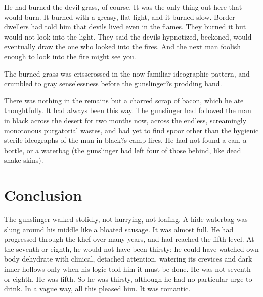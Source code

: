 \documentclass[
11pt,%
tightenlines,%
twoside,%
onecolumn,%
nofloats,%
nobibnotes,%
nofootinbib,%
superscriptaddress,%
noshowpacs,%
centertags]%
{revtex4}
\begin{document}
He had burned the devil-grass, of course. It was the only thing out here that would burn. It burned with a greasy, flat light, and it burned slow. Border dwellers had told him that devils lived even in the flames. They burned it but would not look into the light. They said the devils hypnotized, beckoned, would eventually draw the one who looked into the fires. And the next man foolish enough to look into the fire might see you.

The burned grass was crisscrossed in the now-familiar ideographic pattern, and crumbled to gray senselessness before the gunslinger?s prodding hand. 

There was nothing in the remains but a charred scrap of bacon, which he ate thoughtfully. It had always been this way. The gunslinger had followed the man in black across the desert for two months now, across the endless, screamingly monotonous purgatorial wastes, and had yet to find spoor other than the hygienic sterile ideographs of the man in black?s camp fires. He had not found a can, a bottle, or a waterbag (the gunslinger had left four of those behind, like dead snake-skins).

\section{Conclusion}

The gunslinger walked stolidly, not hurrying, not loafing. A hide waterbag was slung around his middle like a bloated sausage. It was almost full. He had progressed through the khef over many years, and had reached the fifth level. At the seventh or eighth, he would not have been thirsty; he could have watched own body dehydrate with clinical, detached attention, watering its crevices and dark inner hollows only when his logic told him it must be done. He was not seventh or eighth. He was fifth. So he was thirsty, although he had no particular urge to drink. In a vague way, all this pleased him. It was romantic.
\end{document}

